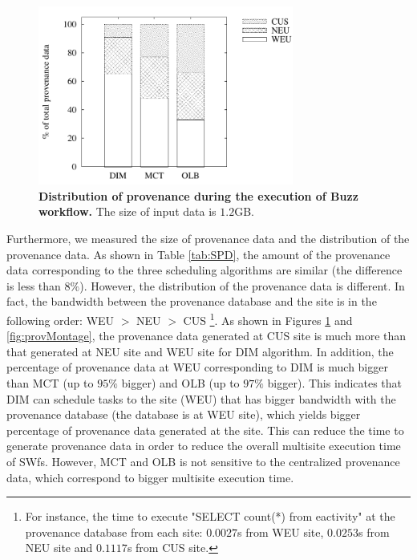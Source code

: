 \begin{figure}
\begin{centering}
\captionsetup{justification=centering}
\includegraphics[width=84mm]{figures/provBuzz}
\par\end{centering}
\caption{\textbf{Distribution of provenance during the execution of Buzz workflow.} The size of input data is $1.2$GB.}
\label{fig:provBuzz}
\end{figure}

Furthermore, we measured the size of provenance data and the distribution of the provenance data. As shown in Table \ref{tab:SPD}, the amount of the provenance data corresponding to the three scheduling algorithms are similar (the difference is less than $8\%$). However, the distribution of the provenance data is different. In fact, the bandwidth between the provenance database and the site is in the following order: WEU $>$ NEU $>$ CUS \footnote{For instance, the time to execute "SELECT count(*) from eactivity" at the provenance database from each site: $0.0027$s from WEU site, $0.0253$s from NEU site and $0.1117$s from CUS site.}. As shown in Figures \ref{fig:provBuzz} and \ref{fig:provMontage}, the provenance data generated at CUS site is much more than that generated at NEU site and WEU site for DIM algorithm. In addition, the percentage of provenance data at WEU corresponding to DIM is much bigger than MCT (up to $95\%$ bigger) and OLB (up to $97\%$ bigger). This indicates that DIM can schedule tasks to the site (WEU) that has bigger bandwidth with the provenance database (the database is at WEU site), which yields bigger percentage of provenance data generated at the site. This can reduce the time to generate provenance data in order to reduce the overall multisite execution time of SWfs. However, MCT and OLB is not sensitive to the centralized provenance data, which correspond to bigger multisite execution time.

